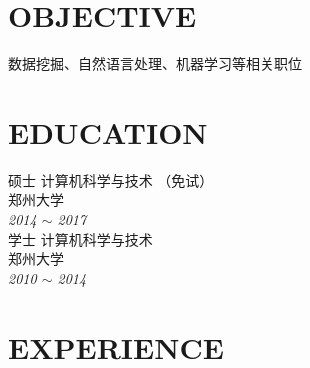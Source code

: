 \documentclass[line, margin]{res}
\begin{document}
\address{likun@stu.zzu.edu.cn}
\address{152-2511-1797}

\begin{resume}
\vspace {5pt}
\section{OBJECTIVE}
 { 数据挖掘、自然语言处理、机器学习等相关职位}

\section{EDUCATION} 
 { 硕士 计算机科学与技术 （免试）  \\
 郑州大学 }\\
 {\sl 2014 $\sim$ 2017} \\
[15pt]
 { 学士 计算机科学与技术 \\
 郑州大学 } \\
 {\sl 2010 $\sim$ 2014 }
 
\section{EXPERIENCE}


\end{resume}
\end{document}
